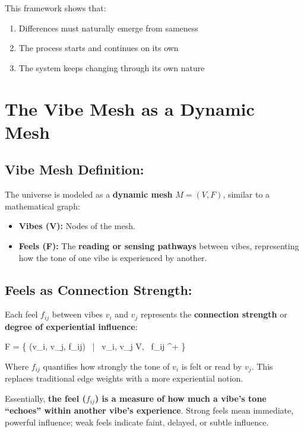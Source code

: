 \documentclass{article}
\let\oldequation\equation
\let\endoldequation\endequation
\renewenvironment{equation}{%
    \noindent\vspace{-\parskip}\vspace{-\baselineskip}%
    \oldequation
}{%
    \endoldequation
    \noindent\vspace{-\parskip}\vspace{-\baselineskip}%
}
\theoremstyle{definition}
\theoremstyle{axiom}
\theoremstyle{theorem}
\theoremstyle{proposition}
\begin{document}
This framework shows that:
\begin{enumerate}
    \item Differences must naturally emerge from sameness
    \item The process starts and continues on its own
    \item The system keeps changing through its own nature
\end{enumerate}

\section{The Vibe Mesh as a Dynamic Mesh}

\subsection{Vibe Mesh Definition:}

The universe is modeled as a \textbf{dynamic mesh} $M = (V, F)$, similar to a mathematical graph:

\begin{itemize}
\item \textbf{Vibes (V):} Nodes of the mesh.
\item \textbf{Feels (F):} The \textbf{reading or sensing pathways} between vibes, representing how the tone of one vibe is experienced by another.
\end{itemize}

\subsection{Feels as Connection Strength:}

Each feel $f_{ij}$ between vibes $v_i$ and $v_j$ represents the \textbf{connection strength} or \textbf{degree of experiential influence}:

\begin{equation}
F = \{ (v_i, v_j, f_{ij}) \ | \ v_i, v_j \in V, \ f_{ij} \in {}^+ \}
\end{equation}

Where $f_{ij}$ quantifies how strongly the tone of $v_i$ is felt or read by $v_j$. This replaces traditional edge weights with a more experiential notion.

Essentially, \textbf{the feel ($f_{ij}$) is a measure of how much a vibe's tone \enquote{echoes} within another vibe's experience}. Strong feels mean immediate, powerful influence; weak feels indicate faint, delayed, or subtle influence.
\end{document}
